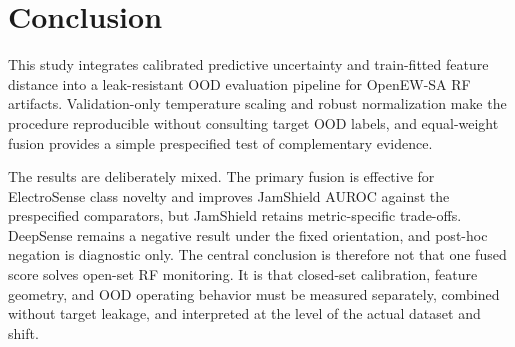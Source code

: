 \section{Conclusion}
\label{sec:conclusion}

This study integrates calibrated predictive uncertainty and train-fitted feature distance into a leak-resistant OOD evaluation pipeline for OpenEW-SA RF artifacts. Validation-only temperature scaling and robust normalization make the procedure reproducible without consulting target OOD labels, and equal-weight fusion provides a simple prespecified test of complementary evidence.

The results are deliberately mixed. The primary fusion is effective for ElectroSense class novelty and improves JamShield AUROC against the prespecified comparators, but JamShield retains metric-specific trade-offs. DeepSense remains a negative result under the fixed orientation, and post-hoc negation is diagnostic only. The central conclusion is therefore not that one fused score solves open-set RF monitoring. It is that closed-set calibration, feature geometry, and OOD operating behavior must be measured separately, combined without target leakage, and interpreted at the level of the actual dataset and shift.
